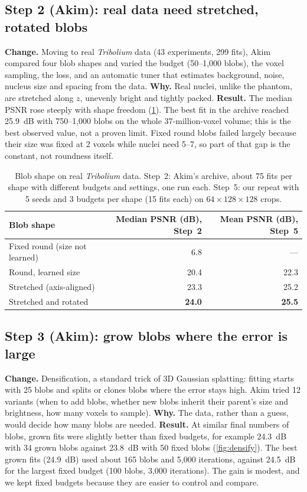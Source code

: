 \documentclass[
  paper=a4,
  fontsize=11pt,
  english,
  numbers=noenddot,
  parskip=half,
  cdgeometry=symmetric,
  cd=barcolor,
  cdfont=false
]{tudscrartcl}
\begin{document}
\subsection{Step 2 (Akim): real data need stretched, rotated blobs}

\textbf{Change.} Moving to real \emph{Tribolium} data (43 experiments, 299 fits), Akim compared
four blob shapes and varied the budget (50--1{,}000 blobs), the voxel sampling, the loss, and an
automatic tuner that estimates background, noise, nucleus size and spacing from the data.
\textbf{Why.} Real nuclei, unlike the phantom, are stretched along $z$, unevenly bright and
tightly packed. \textbf{Result.} The median PSNR rose steeply with shape freedom
(\cref{tab:shapes}). The best fit in the archive reached \SI{25.9}{dB} with 750--1{,}000 blobs on
the whole 37-million-voxel volume; this is the best observed value, not a proven limit. Fixed
round blobs failed largely because their size was fixed at 2 voxels while nuclei need 5--7, so
part of that gap is the constant, not roundness itself.

\begin{table}[tb]
  \centering\small
  \begin{tabular}{@{}lrr@{}}
    \toprule
    Blob shape & Median PSNR (dB), Step~2 & Mean PSNR (dB), Step~5 \\
    \midrule
    Fixed round (size not learned) & 6.8 & --- \\
    Round, learned size & 20.4 & 22.3 \\
    Stretched (axis-aligned) & 23.3 & 25.2 \\
    Stretched and rotated & \textbf{24.0} & \textbf{25.5} \\
    \bottomrule
  \end{tabular}
  \caption{Blob shape on real \emph{Tribolium} data. Step~2: Akim's archive, about 75 fits per
  shape with different budgets and settings, one run each. Step~5: our repeat with 5 seeds and
  3 budgets per shape (15 fits each) on $64\times128\times128$ crops.}
  \label{tab:shapes}
\end{table}

\subsection{Step 3 (Akim): grow blobs where the error is large}

\textbf{Change.} Densification, a standard trick of 3D Gaussian splatting: fitting starts with
25 blobs and splits or clones blobs where the error stays high. Akim tried 12 variants (when to
add blobs, whether new blobs inherit their parent's size and brightness, how many voxels to
sample). \textbf{Why.} The data, rather than a guess, would decide how many blobs are needed.
\textbf{Result.} At similar final numbers of blobs, grown fits were slightly better than fixed
budgets, for example \SI{24.3}{dB} with 34 grown blobs against \SI{23.8}{dB} with 50 fixed
blobs (\cref{fig:densify}). The best grown fits (\SI{24.9}{dB}) used about 165 blobs and
5{,}000 iterations, against \SI{24.5}{dB} for the largest fixed budget (100 blobs, 3{,}000
iterations). The gain is modest, and we kept fixed budgets because they are easier to control
and compare.
\end{document}
